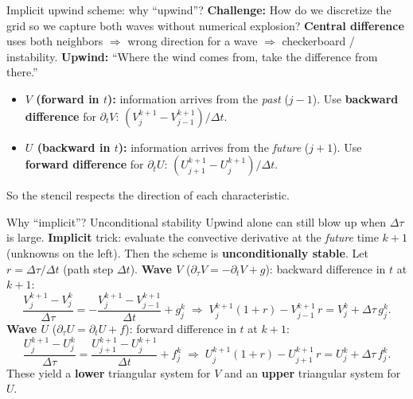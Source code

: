 \documentclass{beamer}
\begin{document}
\begin{frame}{Implicit upwind scheme: why ``upwind''?}
    \textbf{Challenge:} How do we discretize the grid so we capture both waves without numerical explosion?
    \vspace{0.4em}
    \textbf{Central difference} uses both neighbors $\Rightarrow$ wrong direction for a wave $\Rightarrow$ checkerboard / instability.
    \vspace{0.4em}
    \textbf{Upwind:} ``Where the wind comes from, take the difference from there.''
    \begin{itemize}
        \item \textbf{$V$ (forward in $t$):} information arrives from the \emph{past} ($j-1$). Use \textbf{backward difference} for $\partial_t V$: $(V_j^{k+1} - V_{j-1}^{k+1})/\Delta t$.
        \item \textbf{$U$ (backward in $t$):} information arrives from the \emph{future} ($j+1$). Use \textbf{forward difference} for $\partial_t U$: $(U_{j+1}^{k+1} - U_j^{k+1})/\Delta t$.
    \end{itemize}
    So the stencil respects the direction of each characteristic.
\end{frame}

\begin{frame}{Why ``implicit''? Unconditional stability}
    Upwind alone can still blow up when $\Delta\tau$ is large. \textbf{Implicit} trick: evaluate the convective derivative at the \emph{future} time $k+1$ (unknowns on the left). Then the scheme is \textbf{unconditionally stable}.
    \vspace{0.4em}
    Let $r = \Delta\tau/\Delta t$ (path step $\Delta t$).
    \vspace{0.3em}
    \textbf{Wave $V$} ($\partial_\tau V = -\partial_t V + g$): backward difference in $t$ at $k+1$:
    \[
    \frac{V_j^{k+1} - V_j^k}{\Delta\tau} = -\frac{V_j^{k+1} - V_{j-1}^{k+1}}{\Delta t} + g_j^k
    \;\Rightarrow\;
    V_j^{k+1}(1+r) - V_{j-1}^{k+1}\,r = V_j^k + \Delta\tau\,g_j^k.
    \]
    \textbf{Wave $U$} ($\partial_\tau U = \partial_t U + f$): forward difference in $t$ at $k+1$:
    \[
    \frac{U_j^{k+1} - U_j^k}{\Delta\tau} = \frac{U_{j+1}^{k+1} - U_j^{k+1}}{\Delta t} + f_j^k
    \;\Rightarrow\;
    U_j^{k+1}(1+r) - U_{j+1}^{k+1}\,r = U_j^k + \Delta\tau\,f_j^k.
    \]
    These yield a \textbf{lower} triangular system for $V$ and an \textbf{upper} triangular system for $U$.
\end{frame}
\end{document}
